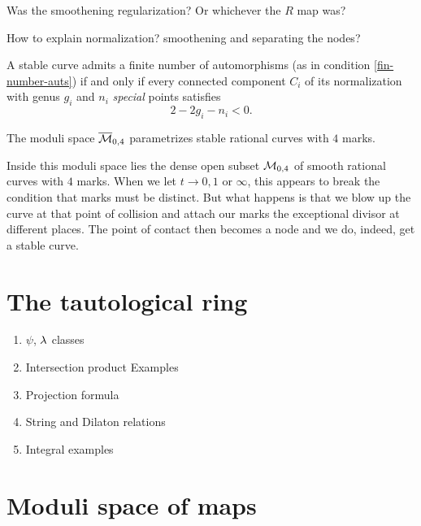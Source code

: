 \documentclass[12pt]{memoir}
\begin{document}
\begin{Qn}
Was the smoothening regularization? Or whichever the $R$ map was?
\end{Qn}

\begin{Qn}
    How to explain normalization? smoothening and separating the nodes?
\end{Qn}

\begin{Th}
A stable curve admits a finite number of automorphisms (as in condition \ref{fin-number-auts}) if and only if every connected component $C_i$ of its normalization with genus $g_i$ and $n_i$ \emph{special} points satisfies 
$$2-2g_i-n_i<0.$$
\end{Th}


\begin{Ex}
The moduli space $\overline{\mathcal{M}}_{0,4}$ parametrizes stable rational curves with $4$ marks.\par 
Inside this moduli space lies the dense open subset $\mathcal{M}_{0,4}$ of smooth rational curves with $4$ marks. 
When we let $t\to 0,1$ or $\infty$, this appears to break the condition that marks must be distinct. But what happens is that we blow up the curve at that point of collision and attach our marks the exceptional divisor at different places. The point of contact then becomes a node and we do, indeed, get a stable curve. 
\end{Ex}

\section{The tautological ring}

\begin{enumerate}
    \item $\psi$, $\lambda$ classes
    \item Intersection product Examples
    \item Projection formula
    \item String and Dilaton relations
    \item Integral examples
\end{enumerate}

\section{Moduli space of maps}
\end{document}
